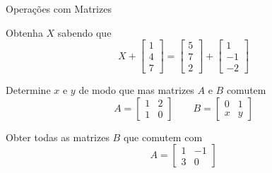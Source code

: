 \begin{exercicios}{Operações com Matrizes}
    \begin{exercicio}
        Obtenha $X$ sabendo que 
        \[ X + \left[\begin{array}{r} 1 \\  4 \\  7 \end{array} \right]
        = \left[\begin{array}{r} 5 \\  7 \\  2 \end{array} \right]
        + \left[\begin{array}{r} 1 \\ -1 \\ -2 \end{array} \right]
        \]
    \end{exercicio}        
        
    \begin{exercicio}
        Determine $x$ e $y$ de modo que mas matrizes $A$ e $B$ comutem
        \[ A=\left[\begin{array}{rr}
                1 & 2 \\
                1 & 0
            \end{array}\right]
            \qquad
            B=\left[\begin{array}{rr}
                0 & 1 \\
                x & y
            \end{array}\right]
        \]
    \end{exercicio}
            
    \begin{exercicio}
        Obter todas as matrizes $B$ que comutem com 
          \[ A=\left[\begin{array}{rr}
                        1 & -1 \\
                        3 &  0
                    \end{array}\right]\]
    \end{exercicio}


\end{exercicios}
